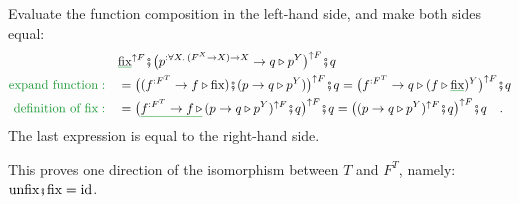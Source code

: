 Evaluate the function composition in the left-hand side, and make
both sides equal:
\begin{align*}
 & \gunderline{\text{fix}}^{\uparrow F}\bef\big(p^{:\forall X.\,(F^{X}\rightarrow X)\rightarrow X}\rightarrow q\triangleright p^{Y}\big)^{\uparrow F}\bef q\\
{\color{greenunder}\text{expand function}:}\quad & =\big((f^{:F^{T}}\rightarrow f\triangleright\text{fix})\bef(p\rightarrow q\triangleright p^{Y})\big)^{\uparrow F}\bef q=\big(f^{:F^{T}}\rightarrow q\triangleright(f\triangleright\gunderline{\text{fix}})^{Y}\big)^{\uparrow F}\bef q\\
{\color{greenunder}\text{definition of }\text{fix}:}\quad & =\big(\gunderline{f^{:F^{T}}\rightarrow f\,\triangleright}\,(p\rightarrow q\triangleright p^{Y})^{\uparrow F}\bef q\big)^{\uparrow F}\bef q=\big((p\rightarrow q\triangleright p^{Y})^{\uparrow F}\bef q\big)^{\uparrow F}\bef q\quad.
\end{align*}
The last expression is equal to the right-hand side.

This proves one direction of the isomorphism between $T$ and $F^{T}$,
namely: $\text{unfix}\bef\text{fix}=\text{id}$.

